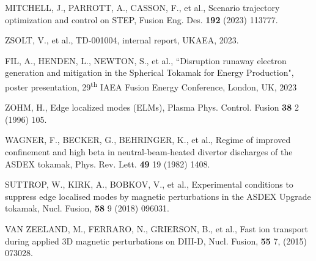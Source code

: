 \documentclass[10pt, a4paper, twoside]{article}
\begin{document}
\begin{thebibliography}{9}
    MITCHELL, J., PARROTT, A., CASSON, F., et al.,
    Scenario trajectory optimization and control on STEP,
    Fusion Eng. Des.
    \textbf{192} 
    (2023) 
    113777.

    ZSOLT, V., et al., 
    TD-001004, 
    internal report, 
    UKAEA, 
    2023.

    FIL, A., HENDEN, L., NEWTON, S., et al.,
    ``Disruption runaway electron generation and mitigation in the Spherical Tokamak for Energy Production",
    poster presentation, 
    29\textsuperscript{th} IAEA Fusion Energy Conference,
    London, UK, 
    2023

    ZOHM, H., 
    Edge localized modes (ELMs), 
    Plasma Phys. Control. Fusion 
    \textbf{38} 2 
    (1996) 
    105.

    WAGNER, F., BECKER, G., BEHRINGER, K., et al., 
    Regime of improved confinement and high beta in neutral-beam-heated divertor discharges of the ASDEX tokamak, 
    Phys. Rev. Lett. 
    \textbf{49} 19
    (1982) 
    1408.

    SUTTROP, W., KIRK, A., BOBKOV, V., et al.,
    Experimental conditions to suppress edge localised modes by magnetic perturbations in the ASDEX Upgrade tokamak,
    Nucl. Fusion,
    \textbf{58} 9 
    (2018) 
    096031.
    
    VAN ZEELAND, M., FERRARO, N., GRIERSON, B., et al.,
    Fast ion transport during applied 3D magnetic perturbations on DIII-D,
    Nucl. Fusion,
    \textbf{55} 7,
    (2015)
    073028.


\end{thebibliography}
\end{document}
